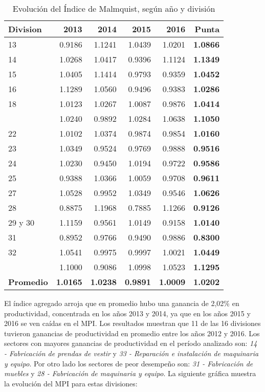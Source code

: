 \documentclass[
]{article}
\begin{document}
\begin{table}[H]

\caption{\label{tab:unnamed-chunk-9}Evolución del Índice de Malmquist, según año y división}
\centering
\begin{tabular}[t]{lrrrr|>{\bfseries}r}
\toprule
Division & 2013 & 2014 & 2015 & 2016 & Punta\\
\midrule
\rowcolor{gray!6}  13 & 0.9186 & 1.1241 & 1.0439 & 1.0201 & 1.0866\\
14 & 1.0268 & 1.0417 & 0.9396 & 1.1124 & 1.1349\\
\rowcolor{gray!6}  15 & 1.0405 & 1.1414 & 0.9793 & 0.9359 & 1.0452\\
16 & 1.1289 & 1.0560 & 0.9496 & 0.9383 & 1.0286\\
\rowcolor{gray!6}  18 & 1.0123 & 1.0267 & 1.0087 & 0.9876 & 1.0414\\
\addlinespace
21 & 1.0240 & 0.9892 & 1.0284 & 1.0638 & 1.1050\\
\rowcolor{gray!6}  22 & 1.0102 & 1.0374 & 0.9874 & 0.9854 & 1.0160\\
23 & 1.0349 & 0.9524 & 0.9769 & 0.9888 & 0.9516\\
\rowcolor{gray!6}  24 & 1.0230 & 0.9450 & 1.0194 & 0.9722 & 0.9586\\
25 & 0.9388 & 1.0366 & 1.0059 & 0.9708 & 0.9611\\
\addlinespace
\rowcolor{gray!6}  27 & 1.0528 & 0.9952 & 1.0349 & 0.9546 & 1.0626\\
28 & 0.8875 & 1.1968 & 0.7885 & 1.1266 & 0.9126\\
\rowcolor{gray!6}  29 y 30 & 1.1159 & 0.9561 & 1.0149 & 0.9158 & 1.0140\\
31 & 0.8952 & 0.9766 & 0.9490 & 0.9886 & 0.8300\\
\rowcolor{gray!6}  32 & 1.0541 & 0.9975 & 0.9997 & 1.0021 & 1.0449\\
\addlinespace
33 & 1.1000 & 0.9086 & 1.0998 & 1.0523 & 1.1295\\
\rowcolor{gray!6}  \textbf{Promedio} & \textbf{1.0165} & \textbf{1.0238} & \textbf{0.9891} & \textbf{1.0009} & \textbf{1.0202}\\
\bottomrule
\end{tabular}
\end{table}

El índice agregado arroja que en promedio hubo una ganancia de 2,02\% en
productividad, concentrada en los años 2013 y 2014, ya que en los años
2015 y 2016 se ven caídas en el MPI. Los resultados muestran que 11 de
las 16 divisiones tuvieron ganancias de productividad en promedio entre
los años 2012 y 2016. Los sectores con mayores ganancias de
productividad en el período analizado son: \emph{14 - Fabricación de
prendas de vestir} y \emph{33 - Reparación e instalación de maquinaria y
equipo}. Por otro lado los sectores de peor desempeño son: \emph{31 -
Fabricación de muebles} y \emph{28 - Fabricación de maquinaria y
equipo}. La siguiente gráfica muestra la evolución del MPI para estas
divisiones:
\end{document}
